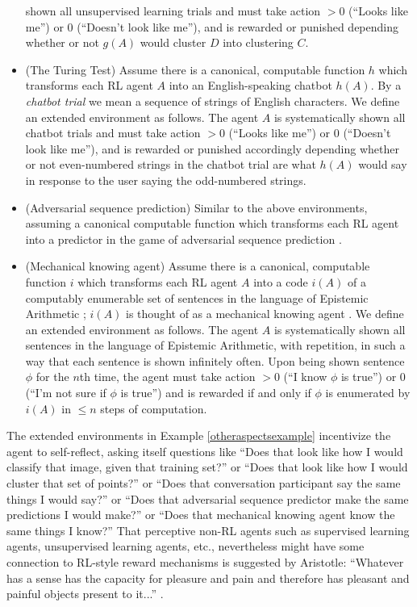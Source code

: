 \documentclass[runningheads]{llncs}
\begin{document}
\begin{example}
\begin{itemize}
        shown all unsupervised learning trials and must take action $>0$ (``Looks like me'')
        or $0$ (``Doesn't look like me''), and is rewarded or punished depending
        whether or not $g(A)$ would cluster $D$ into clustering $C$.
        \item
        (The Turing Test)
        Assume there is a canonical, computable function $h$ which transforms each RL
        agent $A$ into an English-speaking chatbot $h(A)$.
        By a \emph{chatbot trial} we mean a sequence of strings of English characters.
        We define an extended environment as follows. The agent $A$ is systematically
        shown all chatbot trials and must take action $>0$ (``Looks like me'') or $0$
        (``Doesn't look like me''), and is rewarded or punished accordingly depending
        whether or not even-numbered strings in the chatbot trial are what $h(A)$ would
        say in response to the user saying the odd-numbered strings.
        \item
        (Adversarial sequence prediction) Similar to the above environments, assuming
        a canonical computable function which transforms each RL agent into a predictor
        in the game of adversarial sequence prediction \cite{hibbard2008adversarial}
        \cite{hibbard}.
        \item
        (Mechanical knowing agent) Assume there is a canonical, computable function
        $i$ which transforms each RL agent $A$ into a code $i(A)$ of a computably
        enumerable set of sentences in the language of Epistemic Arithmetic
        \cite{shapiro}; $i(A)$ is thought of as a mechanical knowing agent
        \cite{carlson}. We define an extended environment as follows. The agent $A$
        is systematically shown all sentences in the language of Epistemic Arithmetic,
        with repetition, in such a way that each sentence is shown infinitely often.
        Upon being shown sentence $\phi$ for the $n$th time, the agent must take action
        $>0$ (``I know $\phi$ is true'')
        or $0$ (``I'm not sure if $\phi$ is true'')
        and is rewarded if and only if $\phi$ is
        enumerated by $i(A)$ in $\leq n$ steps of computation.
    \end{itemize}
\end{example}

The extended environments in Example \ref{otheraspectsexample} incentivize the agent
to self-reflect, asking itself questions like ``Does that look like how I would
classify that image, given that training set?'' or ``Does that look like how I would
cluster that set of points?'' or ``Does that conversation participant say the same things
I would say?'' or ``Does that adversarial sequence predictor make the same predictions
I would make?'' or ``Does that mechanical knowing agent know the same things I know?''
That perceptive non-RL agents such as supervised learning agents, unsupervised learning agents,
etc., nevertheless might have some connection to RL-style reward mechanisms
is suggested by Aristotle:
``Whatever has a sense has the capacity for pleasure and pain and therefore has pleasant
and painful objects present to it...'' \cite{aristotlesoul}.
\end{document}
